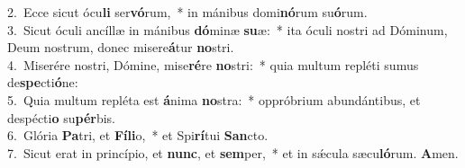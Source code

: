 {2.~}Ecce sicut ócu\textbf{li} ser\textbf{vó}rum,~* in mánibus domi\textbf{nó}rum su\textbf{ó}rum.\\
{3.~}Sicut óculi ancíllæ in mánibus \textbf{dó}minæ \textbf{su}æ:~* ita óculi nostri ad Dóminum, Deum nostrum, donec misere\textbf{á}tur \textbf{no}stri.\\
{4.~}Miserére nostri, Dómine, mise\textbf{ré}re \textbf{no}stri:~* quia multum repléti sumus de\textbf{spe}cti\textbf{ó}ne:\\
{5.~}Quia multum repléta est \textbf{á}nima \textbf{no}stra:~* oppróbrium abundántibus, et despécti\textbf{o} su\textbf{pér}bis.\\
{6.~}Glória \textbf{Pa}tri, et \textbf{Fí}\textbf{li}o,~* et Spi\textbf{rí}tui \textbf{San}cto.\\
{7.~}Sicut erat in princípio, et \textbf{nunc}, et \textbf{sem}per,~* et in sǽcula sæcu\textbf{ló}rum. \textbf{A}men.\\
